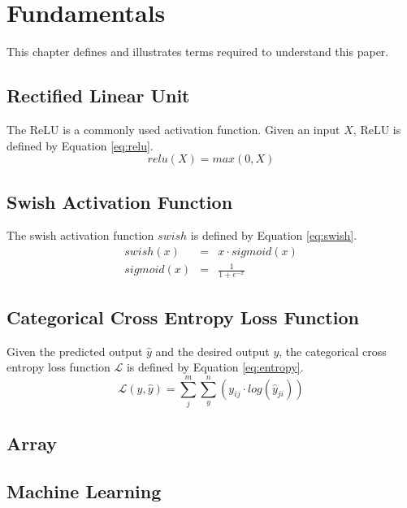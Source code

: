 \chapter{Fundamentals}
\label{chp:funda}
This chapter defines and illustrates terms required to understand this paper.

\section{Rectified Linear Unit}
The \ac{ReLU} is a commonly used activation function. Given an input $X$, \ac{ReLU} is defined by Equation \eqref{eq:relu}. \autocite{ElAmir.2020}
\begin{equation}
	\label{eq:relu}
	relu(X) = max(0,X)
\end{equation}

\section{Swish Activation Function}
The swish activation function $swish$ is defined by Equation \eqref{eq:swish}. \autocites{Ramachandran.2017}{Elfwing.2018}
\begin{equation}
\label{eq:swish}
\begin{array}{lcl}
	swish(x) & = & x \cdot sigmoid(x)\\
	sigmoid(x) & = &  \frac{1}{ 1+e^{-x}}
\end{array}
\end{equation}

\section{Categorical Cross Entropy Loss Function}
Given the predicted output $\hat{y}$ and the desired output $y$, the categorical cross entropy loss function $\mathcal{L}$ is defined by Equation \eqref{eq:entropy}. \autocites{ElAmir.2020}
\begin{equation}
\label{eq:entropy}
\mathcal{L}(y, \hat{y}) = \sum_{j}^{m} \sum_{y}^{n} (y_{ij} \cdot log(\hat{y}_{ji}))
\end{equation}

\section{Array}


\section{Machine Learning}
\label{sec:ml}


